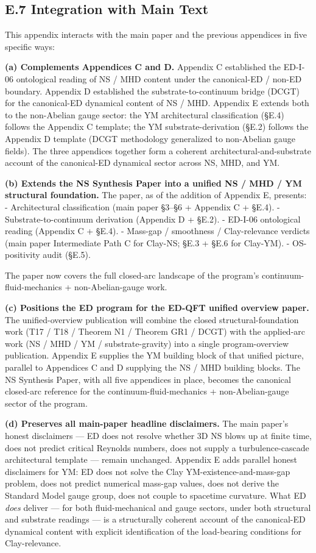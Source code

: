 \documentclass[
  11pt,a4paper]{article}
\begin{document}
\subsection{E.7 Integration with Main
Text}\label{e.7-integration-with-main-text}

This appendix interacts with the main paper and the previous appendices
in five specific ways:

\textbf{(a) Complements Appendices C and D.} Appendix C established the
ED-I-06 ontological reading of NS / MHD content under the canonical-ED /
non-ED boundary. Appendix D established the substrate-to-continuum
bridge (DCGT) for the canonical-ED dynamical content of NS / MHD.
Appendix E extends both to the non-Abelian gauge sector: the YM
architectural classification (§E.4) follows the Appendix C template; the
YM substrate-derivation (§E.2) follows the Appendix D template (DCGT
methodology generalized to non-Abelian gauge fields). The three
appendices together form a coherent architectural-and-substrate account
of the canonical-ED dynamical sector across NS, MHD, and YM.

\textbf{(b) Extends the NS Synthesis Paper into a unified NS / MHD / YM
structural foundation.} The paper, as of the addition of Appendix E,
presents: - Architectural classification (main paper §3--§6 + Appendix C
+ §E.4). - Substrate-to-continuum derivation (Appendix D + §E.2). -
ED-I-06 ontological reading (Appendix C + §E.4). - Mass-gap / smoothness
/ Clay-relevance verdicts (main paper Intermediate Path C for Clay-NS;
§E.3 + §E.6 for Clay-YM). - OS-positivity audit (§E.5).

The paper now covers the full closed-arc landscape of the program's
continuum-fluid-mechanics + non-Abelian-gauge work.

\textbf{(c) Positions the ED program for the ED-QFT unified overview
paper.} The unified-overview publication will combine the closed
structural-foundation work (T17 / T18 / Theorem N1 / Theorem GR1 / DCGT)
with the applied-arc work (NS / MHD / YM / substrate-gravity) into a
single program-overview publication. Appendix E supplies the YM building
block of that unified picture, parallel to Appendices C and D supplying
the NS / MHD building blocks. The NS Synthesis Paper, with all five
appendices in place, becomes the canonical closed-arc reference for the
continuum-fluid-mechanics + non-Abelian-gauge sector of the program.

\textbf{(d) Preserves all main-paper headline disclaimers.} The main
paper's honest disclaimers --- ED does not resolve whether 3D NS blows
up at finite time, does not predict critical Reynolds numbers, does not
supply a turbulence-cascade architectural template --- remain unchanged.
Appendix E adds parallel honest disclaimers for YM: ED does not solve
the Clay YM-existence-and-mass-gap problem, does not predict numerical
mass-gap values, does not derive the Standard Model gauge group, does
not couple to spacetime curvature. What ED \emph{does} deliver --- for
both fluid-mechanical and gauge sectors, under both structural and
substrate readings --- is a structurally coherent account of the
canonical-ED dynamical content with explicit identification of the
load-bearing conditions for Clay-relevance.
\end{document}

